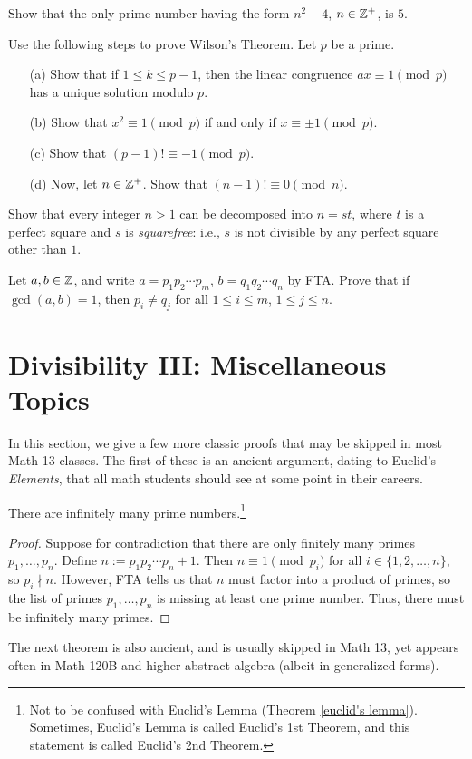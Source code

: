 \documentclass{article}
\begin{document}
\begin{exercise}
Show that the only prime number having the form $n^2-4$, $n\in\mathbb Z^+$, is $5$.
\end{exercise}
\begin{exercise}
Use the following steps to prove Wilson's Theorem. Let $p$ be a prime.
\begin{itemize}
    \item[(a)] Show that if $1\leq k\leq p-1$, then the linear congruence $ax\equiv 1\pmod p$ has a unique solution modulo $p$.
    \item[(b)] Show that $x^2\equiv 1\pmod p$ if and only if $x\equiv \pm 1\pmod p$. 
    \item[(c)] Show that $(p-1)!\equiv -1\pmod p$.
    \item[(d)] Now, let $n\in\mathbb Z^+$. Show that $(n-1)! \equiv 0\pmod n$. 
\end{itemize}
\end{exercise}
\begin{exercise}
Show that every integer $n>1$ can be decomposed into $n = st$, where $t$ is a perfect square and $s$ is \textit{squarefree}: i.e., $s$ is not divisible by any perfect square other than $1$.
\end{exercise}
\begin{exercise}
Let $a,b\in\mathbb Z$, and write $a = p_1p_2\cdots p_m$, $b = q_1q_2 \cdots q_n$ by FTA. Prove that if $\gcd(a,b) = 1$, then $p_i \neq q_j$ for all $1\leq i \leq m$, $1\leq j \leq n$.
\end{exercise}

\section{Divisibility III: Miscellaneous Topics}
In this section, we give a few more classic proofs that may be skipped in most Math 13 classes. The first of these is an ancient argument, dating to Euclid's \textit{Elements}, that all math students should see at some point in their careers.
\begin{theorem}
There are infinitely many prime numbers.\footnote{Not to be confused with Euclid's Lemma (Theorem \ref{euclid's lemma}). Sometimes, Euclid's Lemma is called Euclid's 1st Theorem, and this statement is called Euclid's 2nd Theorem.} 
\end{theorem}
\begin{proof}
Suppose for contradiction that there are only finitely many primes $p_1, \ldots, p_n$. Define $n := p_1p_2 \cdots p_n + 1$. Then $n\equiv 1 \pmod{p_i}$ for all $i\in\{1, 2, \ldots, n\}$, so $p_i\nmid n$. However, FTA tells us that $n$ must factor into a product of primes, so the list of primes $p_1, \ldots, p_n$ is missing at least one prime number. Thus, there must be infinitely many primes.
\end{proof}
\newpage
The next theorem is also ancient, and is usually skipped in Math 13, yet appears often in Math 120B and higher abstract algebra (albeit in generalized forms).
\end{document}
